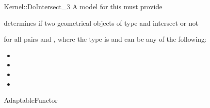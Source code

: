 \begin{ccRefFunctionObjectConcept}{Kernel::DoIntersect_3}
A model for this must provide


{determines if two geometrical objects of type 
 and  intersect or not}

for all pairs  and , where
the type  is  and 
 can be any of the following:
\begin{itemize}
\item {}
\item {}
\item {}
\item {}
\end{itemize}

\ccRefines
AdaptableFunctor

\ccSeeAlso
{}\\

\end{ccRefFunctionObjectConcept}
